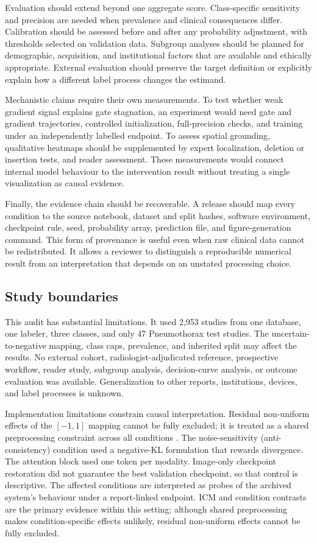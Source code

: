 \documentclass[10pt,a4paper,twocolumn]{article}
\begin{document}
Evaluation should extend beyond one aggregate score. Class-specific sensitivity
and precision are needed when prevalence and clinical consequences differ.
Calibration should be assessed before and after any probability adjustment,
with thresholds selected on validation data. Subgroup analyses should be
planned for demographic, acquisition, and institutional factors that are
available and ethically appropriate. External evaluation should preserve the
target definition or explicitly explain how a different label process changes
the estimand.

Mechanistic claims require their own measurements. To test whether weak gradient
signal explains gate stagnation, an experiment would need gate and gradient
trajectories, controlled initialization, full-precision checks, and training
under an independently labelled endpoint. To assess spatial grounding,
qualitative heatmaps should be supplemented by expert localization, deletion or
insertion tests, and reader assessment. These measurements would connect
internal model behaviour to the intervention result without treating a single
visualization as causal evidence.

Finally, the evidence chain should be recoverable. A release should map every
condition to the source notebook, dataset and split hashes, software
environment, checkpoint rule, seed, probability array, prediction file, and
figure-generation command. This form of provenance is useful even when raw
clinical data cannot be redistributed. It allows a reviewer to distinguish a
reproducible numerical result from an interpretation that depends on an
unstated processing choice.

\subsection{Study boundaries}\label{sec:limitations}

This audit has substantial limitations. It used 2,953 studies from one
database, one labeler, three classes, and only 47 Pneumothorax test studies. The
uncertain-to-negative mapping, class caps, prevalence, and inherited split may
affect the results. No external cohort, radiologist-adjudicated reference,
prospective workflow, reader study, subgroup analysis, decision-curve analysis,
or outcome evaluation was available. Generalization to other reports,
institutions, devices, and label processes is unknown.

Implementation limitations constrain causal interpretation. Residual
non-uniform effects of the $[-1,1]$ mapping cannot be fully excluded; it is
treated as a shared preprocessing constraint across all conditions
\cite{cohen2022torchxrayvision}. The noise-sensitivity (anti-consistency) condition
used a negative-KL formulation that rewards divergence. The attention block
used one token per modality. Image-only checkpoint restoration did not
guarantee the best validation checkpoint, so that control is descriptive.
The affected conditions are interpreted as probes of the archived system's
behaviour under a report-linked endpoint. ICM and condition contrasts are the
primary evidence within this setting; although shared preprocessing makes
condition-specific effects unlikely, residual non-uniform effects cannot be
fully excluded.
\end{document}
